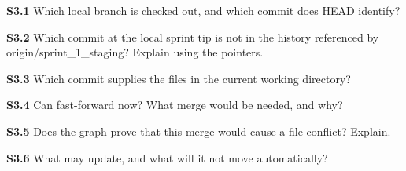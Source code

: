 \textbf{S3.1} Which local branch is checked out, and which commit does HEAD identify?\par
\blankbox{1.5cm}
\textbf{S3.2} Which commit at the local sprint tip is not in the history referenced by origin/sprint\_1\_staging? Explain using the pointers.\par
\blankbox{1.8cm}
\textbf{S3.3} Which commit supplies the files in the current working directory?\par
\blankbox{1.5cm}
\textbf{S3.4} Can  fast-forward now? What merge would be needed, and why?\par
\blankbox{2cm}
\textbf{S3.5} Does the graph prove that this merge would cause a file conflict? Explain.\par
\blankbox{1.5cm}
\textbf{S3.6} What may  update, and what will it not move automatically?\par
\blankbox{2cm}
\fi
